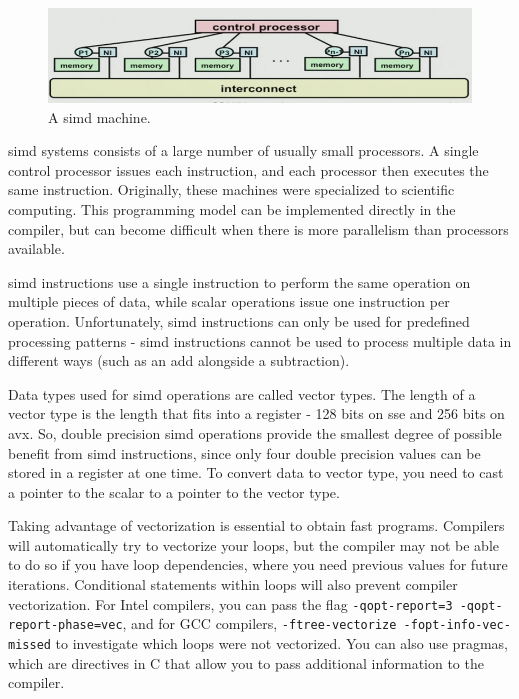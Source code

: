 \documentclass[10pt]{article}
\begin{document}
\begin{flushleft}
\begin{figure}[H]
\centering
\includegraphics[width=0.75\linewidth]{figures/simd.pdf}
\caption{A \gls{simd} machine.}
\end{figure}

\gls{simd} systems consists of a large number of usually small processors. A single control processor issues each instruction, and each processor then executes the same instruction. Originally, these machines were specialized to scientific computing. This programming model can be implemented directly in the compiler, but can become difficult when there is more parallelism than processors available. 

\gls{simd} instructions use a single instruction to perform the same operation on multiple pieces of data, while scalar operations issue one instruction per operation. Unfortunately, \gls{simd} instructions can only be used for predefined processing patterns - \gls{simd} instructions cannot be used to process multiple data in different ways (such as an add alongside a subtraction). 

Data types used for \gls{simd} operations are called vector types. The length of a vector type is the length that fits into a register - 128 bits on \gls{sse} and 256 bits on \gls{avx}. So, double precision \gls{simd} operations provide the smallest degree of possible benefit from \gls{simd} instructions, since only four double precision values can be stored in a register at one time. To convert data to vector type, you need to cast a pointer to the scalar to a pointer to the vector type. 

Taking advantage of vectorization is essential to obtain fast programs. Compilers will automatically try to vectorize your loops, but the compiler may not be able to do so if you have loop dependencies, where you need previous values for future iterations. Conditional statements within loops will also prevent compiler vectorization. For Intel compilers, you can pass the flag {\tt -qopt-report=3 -qopt-report-phase=vec}, and for GCC compilers, {\tt -ftree-vectorize -fopt-info-vec-missed} to investigate which loops were not vectorized. You can also use pragmas, which are directives in C that allow you to pass additional information to the compiler.


\end{flushleft}
\end{document}

